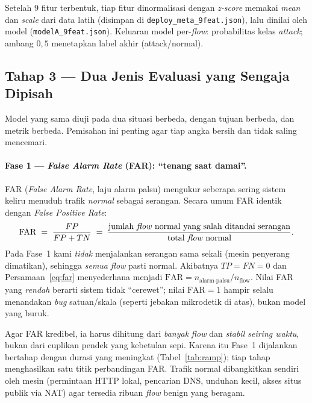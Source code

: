 \documentclass[11pt,a4paper]{article}
\begin{document}
Setelah 9 fitur terbentuk, tiap fitur dinormalisasi dengan \emph{z-score}
memakai \emph{mean} dan \emph{scale} dari data latih (disimpan di
\texttt{deploy\_meta\_9feat.json}), lalu dinilai oleh model
(\texttt{modelA\_9feat.json}). Keluaran model per-\emph{flow}: probabilitas
kelas \emph{attack}; ambang $0{,}5$ menetapkan label akhir (attack/normal).

\subsection{Tahap 3 --- Dua Jenis Evaluasi yang Sengaja Dipisah}
Model yang sama diuji pada dua situasi berbeda, dengan tujuan berbeda, dan
metrik berbeda. Pemisahan ini penting agar tiap angka bersih dan tidak saling
mencemari.

\paragraph{Fase 1 --- \emph{False Alarm Rate} (FAR): ``tenang saat damai''.}
FAR (\emph{False Alarm Rate}, laju alarm palsu) mengukur seberapa sering sistem
keliru menuduh trafik \emph{normal} sebagai serangan. Secara umum FAR identik
dengan \emph{False Positive Rate}:
\begin{equation}
\label{eq:far}
\mathrm{FAR} \;=\; \frac{FP}{FP + TN}
\;=\; \frac{\text{jumlah \emph{flow} normal yang salah ditandai serangan}}
{\text{total \emph{flow} normal}} .
\end{equation}
Pada Fase~1 kami \emph{tidak} menjalankan serangan sama sekali (mesin penyerang
dimatikan), sehingga \emph{semua} \emph{flow} pasti normal. Akibatnya
$TP=FN=0$ dan Persamaan~\eqref{eq:far} menyederhana menjadi
$\mathrm{FAR} = n_{\text{alarm-palsu}} / n_{\text{flow}}$. Nilai FAR yang
\emph{rendah} berarti sistem tidak ``cerewet''; nilai $\mathrm{FAR}=1$ hampir
selalu menandakan \emph{bug} satuan/skala (seperti jebakan mikrodetik di atas),
bukan model yang buruk.

Agar FAR kredibel, ia harus dihitung dari \emph{banyak} \emph{flow} dan
\emph{stabil seiring waktu}, bukan dari cuplikan pendek yang kebetulan sepi.
Karena itu Fase~1 dijalankan bertahap dengan durasi yang meningkat
(Tabel~\ref{tab:ramp}); tiap tahap menghasilkan satu titik perbandingan FAR.
Trafik normal dibangkitkan sendiri oleh mesin (permintaan HTTP lokal, pencarian
DNS, unduhan kecil, akses situs publik via NAT) agar tersedia ribuan \emph{flow}
benign yang beragam.
\end{document}
